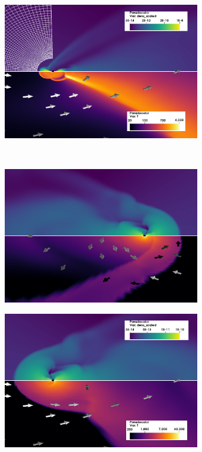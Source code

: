 \documentclass{aa}
\begin{document}
\begin{figure}
\begin{subfigure}{0.5\textwidth}
\begin{center}
\label{fig:subim2}
\end{center}
\end{subfigure}
\begin{subfigure}{0.5\textwidth}
\begin{center}
\includegraphics[width=8.6cm]{Pictures/isoHot_2.png} 
\label{fig:subim1}
\end{center}
\end{subfigure}
\vspace*{0.8cm}\\
\hspace*{-0.2cm}
\begin{subfigure}{0.5\textwidth}
\begin{center}
\includegraphics[width=8.6cm]{Pictures/isoS_1.png}
\label{fig:subim2}
\end{center}
\end{subfigure}
\begin{subfigure}{0.5\textwidth}
\begin{center}
\includegraphics[width=8.6cm]{Pictures/isoS_2.png}

\end{center}
\end{subfigure}
\end{figure}
\end{document}
